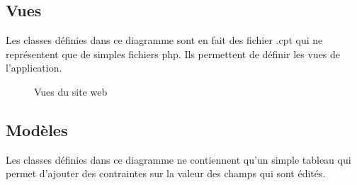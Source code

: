 \subsection{Vues}

Les classes définies dans ce diagramme sont en fait des fichier .cpt qui ne représentent que de simples fichiers php. Ils permettent de définir les vues de l'application.

\begin{figure}[H]
	\begin{center}\end{center}
	\caption{Vues du site web}
\end{figure}

\subsection{Modèles}

Les classes définies dans ce diagramme ne contiennent qu'un simple tableau qui permet d'ajouter des contraintes sur la valeur des champs qui sont édités.

